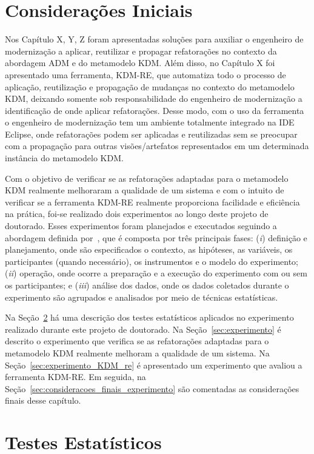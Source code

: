 \section{Considerações Iniciais}

Nos Capítulo X, Y, Z  foram apresentadas soluções para auxiliar o engenheiro de modernização a aplicar, reutilizar e propagar refatorações no contexto da abordagem ADM e do metamodelo KDM. Além disso, no Capítulo X foi apresentado uma ferramenta, KDM-RE, que automatiza todo o processo de aplicação, reutilização e propagação de mudanças no contexto do metamodelo KDM, deixando somente sob responsabilidade do engenheiro de modernização a identificação de onde aplicar refatorações. Desse modo, com o uso da ferramenta o engenheiro de modernização tem um ambiente totalmente integrado na IDE Eclipse, onde refatorações podem ser aplicadas e reutilizadas sem se preocupar com a propagação para outras visões/artefatos representados em um determinada instância do metamodelo KDM.

Com o objetivo de verificar se as refatorações adaptadas para o metamodelo KDM realmente melhoraram a qualidade de um sistema e com o intuito de verificar se a ferramenta KDM-RE realmente proporciona facilidade e eficiência na prática, foi-se realizado dois experimentos ao longo deste projeto de doutorado. Esses experimentos foram planejados e executados seguindo a abordagem definida por~, que é composta por três principais fases: (\textit{i}) definição e planejamento, onde são especificados o contexto, as hipóteses, as variáveis, os participantes (quando necessário), os instrumentos e o modelo do experimento; (\textit{ii}) operação, onde ocorre a preparação e a execução do experimento com ou sem os participantes; e (\textit{iii}) análise dos dados, onde os dados coletados durante o experimento são agrupados e analisados por meio de técnicas estatísticas.

Na Seção~\ref{sec:teste_estatisticos} há uma descrição dos testes estatísticos aplicados no experimento realizado durante este projeto de doutorado. Na Seção~\ref{sec:experimento} é descrito o experimento que verifica se as refatorações adaptadas para o metamodelo KDM realmente melhoram a qualidade de um sistema. Na Seção~\ref{sec:experimento_KDM_re} é apresentado um experimento que avaliou a ferramenta KDM-RE. Em seguida, na Seção~\ref{sec:consideracoes_finais_experimento} são comentadas as considerações finais desse capítulo.

\section{Testes Estatísticos}\label{sec:teste_estatisticos}

